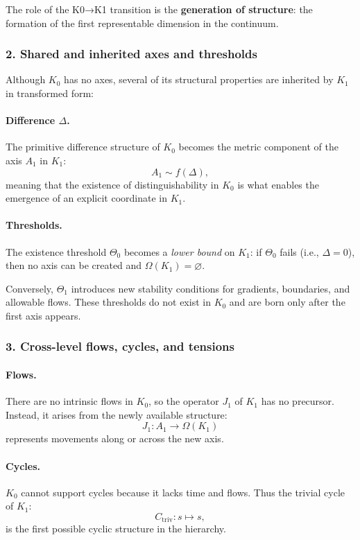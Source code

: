 The role of the K0→K1 transition is the \textbf{generation of structure}:
the formation of the first representable dimension in the continuum.

\subsubsection{2. Shared and inherited axes and thresholds}

Although $K_0$ has no axes, several of its structural properties are inherited
by $K_1$ in transformed form:

\paragraph{Difference \texorpdfstring{$\Delta$}{\Delta}.}
The primitive difference structure of $K_0$ becomes the metric component of
the axis $A_1$ in $K_1$:
\[
A_1 \sim f(\Delta),
\]
meaning that the existence of distinguishability in $K_0$ is what enables
the emergence of an explicit coordinate in $K_1$.

\paragraph{Thresholds.}
The existence threshold $\Theta_0$ becomes a \emph{lower bound} on $K_1$:
if $\Theta_0$ fails (i.e., $\Delta=0$), then no axis can be created and
$\Omega(K_1)=\varnothing$.

Conversely, $\Theta_1$ introduces new stability conditions for gradients,
boundaries, and allowable flows. These thresholds do not exist in $K_0$ and
are born only after the first axis appears.

\subsubsection{3. Cross-level flows, cycles, and tensions}

\paragraph{Flows.}
There are no intrinsic flows in $K_0$, so the operator $J_1$ of $K_1$ has
no precursor. Instead, it arises from the newly available structure:
\[
J_1 : A_1 \rightarrow \Omega(K_1)
\]
represents movements along or across the new axis.

\paragraph{Cycles.}
$K_0$ cannot support cycles because it lacks time and flows.
Thus the trivial cycle of $K_1$:
\[
C_{\mathrm{triv}} : s \mapsto s,
\]
is the first possible cyclic structure in the hierarchy.


